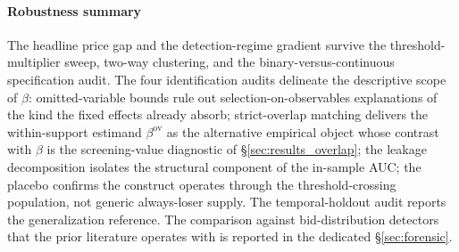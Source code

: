 \paragraph*{Robustness summary} The headline price gap and the
detection-regime gradient survive the threshold-multiplier
sweep, two-way clustering, and the binary-versus-continuous
specification audit. The four identification audits delineate
the descriptive scope of $\beta$: omitted-variable bounds rule
out selection-on-observables explanations of the kind the fixed
effects already absorb; strict-overlap matching delivers the
within-support estimand $\beta^{\text{ov}}$ as the alternative
empirical object whose contrast with $\beta$ is the
screening-value diagnostic of §\ref{sec:results_overlap}; the
leakage decomposition isolates the structural component of the
in-sample AUC; the placebo confirms the construct operates
through the threshold-crossing population, not generic
always-loser supply. The temporal-holdout audit reports the
generalization reference. The comparison against
bid-distribution detectors that the prior literature operates
with is reported in the dedicated §\ref{sec:forensic}.
